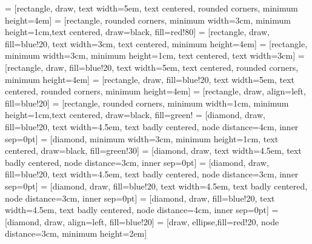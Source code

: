  = [rectangle, draw, text width=5em, text centered, rounded corners, minimum height=4em]
 = [rectangle, rounded corners, minimum width=3cm, minimum height=1cm,text centered, draw=black, fill=red!80]
 = [rectangle, draw, fill=blue!20, text width=3cm, text centered, minimum height=4em]
 = [rectangle, minimum width=3cm, minimum height=1cm, text centered, text width=3cm]
 = [rectangle, draw, fill=blue!20, text width=5em, text centered, rounded corners, minimum height=4em]
 = [rectangle, draw, fill=blue!20, text width=5em, text centered, rounded corners, minimum height=4em]
 = [rectangle, draw, align=left, fill=blue!20]
 = [rectangle, rounded corners, minimum width=1cm, minimum height=1cm,text centered, draw=black, fill=green!%
 = [diamond, draw, fill=blue!20, text width=4.5em, text badly centered, node distance=4cm, inner sep=0pt]
 = [diamond, minimum width=3cm, minimum height=1cm, text centered, draw=black, fill=green!30]
 = [diamond, draw, text width=4.5em, text badly centered, node distance=3cm, inner sep=0pt]
 = [diamond, draw, fill=blue!20, text width=4.5em, text badly centered, node distance=3cm, inner sep=0pt]
 = [diamond, draw, fill=blue!20, text width=4.5em, text badly centered, node distance=3cm, inner sep=0pt]
 = [diamond, draw, fill=blue!20, text width=4.5em, text badly centered, node distance=4cm, inner sep=0pt]
 = [diamond, draw, align=left, fill=blue!20]
 = [draw, ellipse,fill=red!20, node distance=3cm, minimum height=2em]
